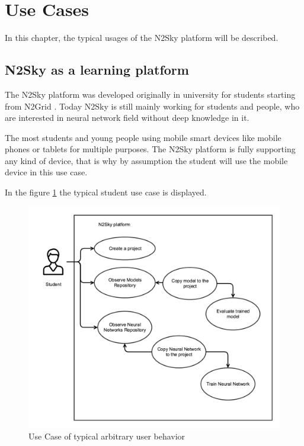 \section{Use Cases}\label{Use Cases}

In this chapter, the typical usages of the N2Sky platform will be described.

\subsection{N2Sky as a learning platform}\label{N2Sky as a learning platform}

The N2Sky platform was developed originally in university for students starting from N2Grid \cite{schikuta2004n2grid}. Today N2Sky is still mainly working for students and people, who are interested in neural network field without deep knowledge in it. 

The most students and young people using mobile smart devices like mobile phones or tablets for multiple purposes. The N2Sky platform is fully supporting any kind of device, that is why by assumption the student will use the mobile device in this use case. 

In the figure \ref{fig:use_case_student} the typical student use case is displayed.


\begin{figure}[htbp]
\begin{center}
  \includegraphics[width=\linewidth]{components/usecase/img/use_case_student.png}
  \caption{Use Case of typical arbitrary user behavior}
  \label{fig:use_case_student}
\end{center}
\end{figure} 

